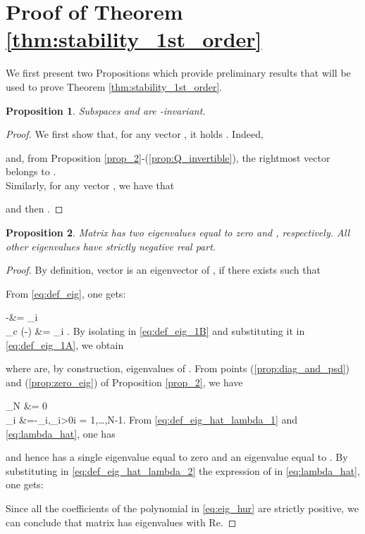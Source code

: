 \documentclass[a4paper]{article}
\theoremstyle{plain}
\newtheorem{prp}{Proposition}
\begin{document}
    \section{Proof of Theorem \ref{thm:stability_1st_order}}
\label{appendix_2}
We first present two Propositions which provide preliminary results that will be used to prove Theorem \ref{thm:stability_1st_order}.
\begin{prp}
	\label{prop:h1_h1}
	Subspaces  and  are -invariant.
\end{prp}
\begin{proof}
	We first show that, for any vector , it holds . Indeed,
	
	and, from Proposition \ref{prop_2}-(\ref{prop:Q_invertible}), the rightmost vector belongs to .\\
	Similarly, for any vector , we have that
	
	and then .
\end{proof}
\begin{prp}
	\label{prop:eig_Qcall}
	Matrix  has two eigenvalues equal to zero and , respectively. All other eigenvalues have strictly negative real part.
\end{prp}
\begin{proof}
	By definition, vector  is an eigenvector of , if there exists  such that 
	
	From \eqref{eq:def_eig}, one gets:
	
		\label{eq:def_eig_1A}
		-&= \lambda_i\\
		\label{eq:def_eig_1B}
		\omega_c (-) &= \lambda_i {}.
	By isolating  in \eqref{eq:def_eig_1B} and substituting it in \eqref{eq:def_eig_1A}, we obtain
	
	where  are, by construction, eigenvalues of . From points (\ref{prop:diag_and_psd}) and (\ref{prop:zero_eig}) of Proposition \ref{prop_2}, we have 
	
		\label{eq:def_eig_hat_lambda_1}
		\hat\lambda_N &= 0\\
		\label{eq:def_eig_hat_lambda_2}
		\hat\lambda_i &=-\gamma_i,\hspace{2mm}\gamma_i>0\hspace{7mm}i = 1,\dots,N-1.
	From \eqref{eq:def_eig_hat_lambda_1} and \eqref{eq:lambda_hat}, one has
	
	and hence  has a single eigenvalue equal to zero and an eigenvalue equal to .
	By substituting in \eqref{eq:def_eig_hat_lambda_2} the expression of  in \eqref{eq:lambda_hat}, one gets:
	
	Since all the coefficients of the polynomial in \eqref{eq:eig_hur} are strictly positive, we can conclude that matrix  has  eigenvalues with Re.
\end{proof}
\end{document}
